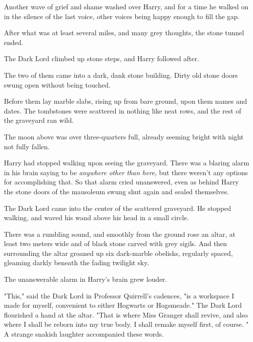 Another wave of grief and shame washed over Harry, and for a time he walked on
in the silence of the last voice, other voices being happy enough to fill the
gap.

After what was at least several miles, and many grey thoughts, the stone tunnel
ended.

The Dark Lord climbed up stone steps, and Harry followed after.

The two of them came into a dark, dank stone building. Dirty old stone doors
swung open without being touched.

Before them lay marble slabs, rising up from bare ground, upon them names and
dates. The tombstones were scattered in nothing like neat rows, and the rest of
the graveyard ran wild.

The moon above was over three-quarters full, already seeming bright with night
not fully fallen.

Harry had stopped walking upon seeing the graveyard. There was a blaring alarm
in his brain saying to be \emph{anywhere other than here,} but there weren't
any options for accomplishing that. So that alarm cried unanswered, even as
behind Harry the stone doors of the mausoleum swung shut again and sealed
themselves.

The Dark Lord came into the center of the scattered graveyard. He stopped
walking, and waved his wand above his head in a small circle.

There was a rumbling sound, and smoothly from the ground rose an altar, at
least two meters wide and of black stone carved with grey sigils. And then
surrounding the altar groaned up six dark-marble obelisks, regularly spaced,
gleaming darkly beneath the fading twilight sky.

The unanswerable alarm in Harry's brain grew louder.

"This," said the Dark Lord in Professor Quirrell's cadences, "is a workspace I
made for myself, convenient to either Hogwarts or Hogsmeade." The Dark Lord
flourished a hand at the altar. "That is where Miss Granger shall revive, and
also where I shall be reborn into my true body. I shall remake myself first, of
course. " A strange
snakish laughter accompanied these words. 


